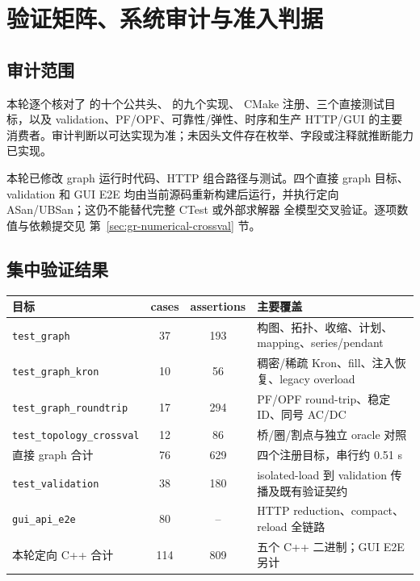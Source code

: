 
\section{验证矩阵、系统审计与准入判据}\label{sec:gr-verification-audit}

\subsection{审计范围}

本轮逐个核对了  的十个公共头、 的九个实现、
CMake 注册、三个直接测试目标，以及 validation、PF/OPF、可靠性/弹性、时序和生产 HTTP/GUI 的主要
消费者。审计判断以可达实现为准；未因头文件存在枚举、字段或注释就推断能力已实现。

本轮已修改 graph 运行时代码、HTTP 组合路径与测试。四个直接 graph 目标、validation 和 GUI E2E
均由当前源码重新构建后运行，并执行定向 ASan/UBSan；这仍不能替代完整 CTest 或外部求解器
全模型交叉验证。逐项数值与依赖提交见
第~\ref{sec:gr-numerical-crossval} 节。

\subsection{集中验证结果}

\begin{center}\small
\begin{tabular}{@{}L{5.0cm}c c L{4.3cm}@{}}
\toprule
目标 & cases & assertions & 主要覆盖\\
\midrule
\texttt{test\_graph} & 37 & 193 & 构图、拓扑、收缩、计划、mapping、series/pendant\\
\texttt{test\_graph\_kron} & 10 & 56 & 稠密/稀疏 Kron、fill、注入恢复、legacy overload\\
\texttt{test\_graph\_roundtrip} & 17 & 294 & PF/OPF round-trip、稳定 ID、同号 AC/DC\\
\texttt{test\_topology\_crossval} & 12 & 86 & 桥/圈/割点与独立 oracle 对照\\
\midrule
直接 graph 合计 & 76 & 629 & 四个注册目标，串行约 0.51 s\\
\texttt{test\_validation} & 38 & 180 & isolated-load 到 validation 传播及既有验证契约\\
\texttt{gui\_api\_e2e} & 80 & -- & HTTP reduction、compact、reload 全链路\\
\midrule
本轮定向 C++ 合计 & 114 & 809 & 五个 C++ 二进制；GUI E2E 另计\\
\bottomrule
\end{tabular}
\end{center}

